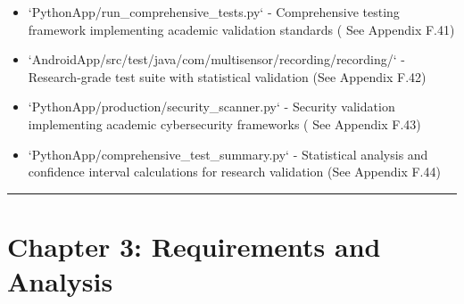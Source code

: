 \documentclass[11pt,a4paper]{report}
\begin{document}
\begin{itemize}
\item `PythonApp/run_comprehensive_tests.py` - Comprehensive testing framework implementing academic validation standards (
  See Appendix F.41)
\item `AndroidApp/src/test/java/com/multisensor/recording/recording/` - Research-grade test suite with statistical
  validation (See Appendix F.42)
\item `PythonApp/production/security_scanner.py` - Security validation implementing academic cybersecurity frameworks (
  See Appendix F.43)
\item `PythonApp/comprehensive_test_summary.py` - Statistical analysis and confidence interval calculations for research
  validation (See Appendix F.44)

\end{itemize}
\hrule

\section{Chapter 3: Requirements and Analysis}
\end{document}
